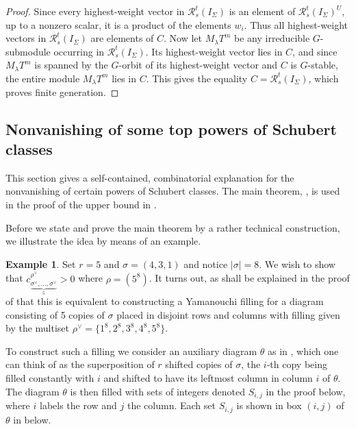 \documentclass[11pt, reqno]{amsart}
\numberwithin{equation}{section}
\theoremstyle{definition}
\newtheorem{example}[theorem]{Example}
\newcommand{\s}{\sigma}
\begin{document}
\begin{proof}
Since every highest-weight vector in $\mathcal R_s^t(I_\Sigma)$ is an element of $\mathcal R_s^t(I_\Sigma)^U$, up to a nonzero scalar, it is a product of the elements $w_i$. Thus all highest-weight vectors in $\mathcal R_s^t(I_\Sigma)$ are elements of $C$. Now let $M_\lambda T^m$ be any irreducible $G$-submodule occurring in $\mathcal R_s^t(I_\Sigma)$. Its highest-weight vector lies in $C$, and since $M_\lambda T^m$ is spanned by the $G$-orbit of its highest-weight vector and $C$ is $G$-stable, the entire module $M_\lambda T^m$ lies in $C$. This gives the equality
$C=\mathcal R_s^t(I_\Sigma)$, which proves finite generation.
\end{proof}

\begin{appendix}

\section{Nonvanishing of some top powers of Schubert classes}\label{appendix}

This section gives a self-contained, combinatorial explanation for the nonvanishing of certain powers of Schubert classes.
The main theorem,  , is used in the proof of the upper bound in .

Before we state and prove the main theorem by a rather technical construction, we illustrate the idea by means of an example.

\begin{example}
Set  $r=5$ and $\s=(4,3,1)$ and notice $|\s|=8$. We wish to show that $c_{\underbrace{\scriptstyle\sigma^\vee,\ldots,\sigma^\vee}_{5}}^{\rho^\vee}> 0$ where $\rho=(5^8)$. It turns out, as shall be explained in the proof of   that this is equivalent to constructing a Yamanouchi filling for a diagram consisting of 5 copies of $\s$ placed in disjoint rows and columns  with filling given by the multiset $\rho^\vee=\{1^8, 2^8, 3^8, 4^8, 5^8\}$.

To construct such a filling we consider an auxiliary diagram $\theta$ as in , which one can think of as the superposition of $r$ shifted copies of $\sigma$, the $i$-th copy being filled constantly with $i$ and shifted to have its leftmost column in column $i$ of $\theta$. The diagram $\theta$ is then filled with sets of integers denoted $S_{i,j}$ in the proof below, where $i$ labels the row and $j$ the column. Each set $S_{i,j}$ is shown in box $(i,j)$ of $\theta$ in  below.


\end{example}
\end{appendix}
\end{document}
